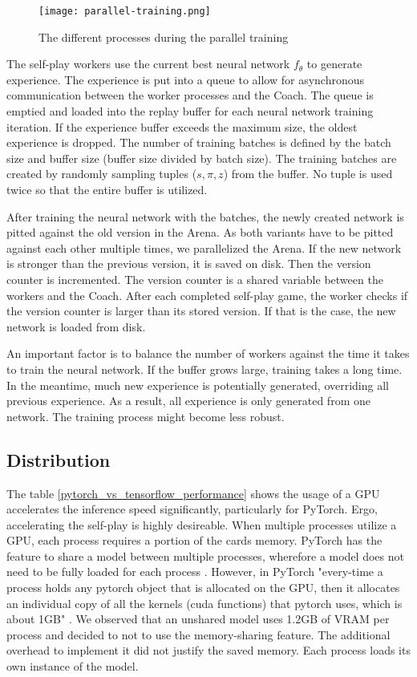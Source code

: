 \begin{figure}
    \centering
    \texttt{[image: parallel-training.png]}
    \caption{The different processes during the parallel training \cite[cf. p. 45]{bruasdal_deep_2020}}
    \label{parallel_training_pipeline}
\end{figure}

The self-play workers use the current best neural network $f_{\theta}$ to generate experience. The experience is put into a queue to allow for asynchronous communication between the worker processes and the Coach. The queue is emptied and loaded into the replay buffer for each neural network training iteration. If the experience buffer exceeds the maximum size, the oldest experience is dropped. The number of training batches is defined by the batch size and buffer size (buffer size divided by batch size). The training batches are created by randomly sampling tuples ($s, \pi, z$) from the buffer. No tuple is used twice so that the entire buffer is utilized.

After training the neural network with the batches, the newly created network is pitted against the old version in the Arena. As both variants have to be pitted against each other multiple times, we parallelized the Arena. If the new network is stronger than the previous version, it is saved on disk. Then the version counter is incremented. The version counter is a shared variable between the workers and the Coach. After each completed self-play game, the worker checks if the version counter is larger than its stored version. If that is the case, the new network is loaded from disk.

An important factor is to balance the number of workers against the time it takes to train the neural network. If the buffer grows large, training takes a long time. In the meantime, much new experience is potentially generated, overriding all previous experience. As a result, all experience is only generated from one network. The training process might become less robust.

\subsection{Distribution}
The table \ref{pytorch_vs_tensorflow_performance} shows the usage of a GPU accelerates the inference speed significantly, particularly for PyTorch. Ergo, accelerating the self-play is highly desireable. When multiple processes utilize a GPU, each process requires a portion of the cards memory. PyTorch has the feature to share a model between multiple processes, wherefore a model does not need to be fully loaded for each process \cite{noauthor_module_nodate}. However, in PyTorch "every-time a process holds any pytorch object that is allocated on the GPU, then it allocates an individual copy of all the kernels (cuda functions) that pytorch uses, which is about 1GB" \cite{radim_shark_sharing_2020}. We observed that an unshared model uses 1.2GB of VRAM per process and decided to not to use the memory-sharing feature. The additional overhead to implement it did not justify the saved memory. Each process loads its own instance of the model.

